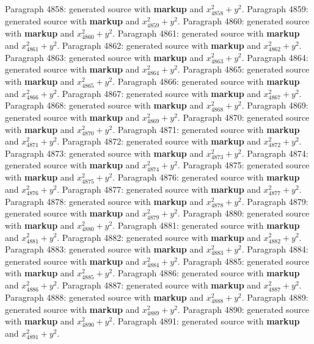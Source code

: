 \documentclass{article}
\begin{document}
Paragraph 4858: generated source with \textbf{markup} and $x_{4858}^2 + y^2$.
Paragraph 4859: generated source with \textbf{markup} and $x_{4859}^2 + y^2$.
Paragraph 4860: generated source with \textbf{markup} and $x_{4860}^2 + y^2$.
Paragraph 4861: generated source with \textbf{markup} and $x_{4861}^2 + y^2$.
Paragraph 4862: generated source with \textbf{markup} and $x_{4862}^2 + y^2$.
Paragraph 4863: generated source with \textbf{markup} and $x_{4863}^2 + y^2$.
Paragraph 4864: generated source with \textbf{markup} and $x_{4864}^2 + y^2$.
Paragraph 4865: generated source with \textbf{markup} and $x_{4865}^2 + y^2$.
Paragraph 4866: generated source with \textbf{markup} and $x_{4866}^2 + y^2$.
Paragraph 4867: generated source with \textbf{markup} and $x_{4867}^2 + y^2$.
Paragraph 4868: generated source with \textbf{markup} and $x_{4868}^2 + y^2$.
Paragraph 4869: generated source with \textbf{markup} and $x_{4869}^2 + y^2$.
Paragraph 4870: generated source with \textbf{markup} and $x_{4870}^2 + y^2$.
Paragraph 4871: generated source with \textbf{markup} and $x_{4871}^2 + y^2$.
Paragraph 4872: generated source with \textbf{markup} and $x_{4872}^2 + y^2$.
Paragraph 4873: generated source with \textbf{markup} and $x_{4873}^2 + y^2$.
Paragraph 4874: generated source with \textbf{markup} and $x_{4874}^2 + y^2$.
Paragraph 4875: generated source with \textbf{markup} and $x_{4875}^2 + y^2$.
Paragraph 4876: generated source with \textbf{markup} and $x_{4876}^2 + y^2$.
Paragraph 4877: generated source with \textbf{markup} and $x_{4877}^2 + y^2$.
Paragraph 4878: generated source with \textbf{markup} and $x_{4878}^2 + y^2$.
Paragraph 4879: generated source with \textbf{markup} and $x_{4879}^2 + y^2$.
Paragraph 4880: generated source with \textbf{markup} and $x_{4880}^2 + y^2$.
Paragraph 4881: generated source with \textbf{markup} and $x_{4881}^2 + y^2$.
Paragraph 4882: generated source with \textbf{markup} and $x_{4882}^2 + y^2$.
Paragraph 4883: generated source with \textbf{markup} and $x_{4883}^2 + y^2$.
Paragraph 4884: generated source with \textbf{markup} and $x_{4884}^2 + y^2$.
Paragraph 4885: generated source with \textbf{markup} and $x_{4885}^2 + y^2$.
Paragraph 4886: generated source with \textbf{markup} and $x_{4886}^2 + y^2$.
Paragraph 4887: generated source with \textbf{markup} and $x_{4887}^2 + y^2$.
Paragraph 4888: generated source with \textbf{markup} and $x_{4888}^2 + y^2$.
Paragraph 4889: generated source with \textbf{markup} and $x_{4889}^2 + y^2$.
Paragraph 4890: generated source with \textbf{markup} and $x_{4890}^2 + y^2$.
Paragraph 4891: generated source with \textbf{markup} and $x_{4891}^2 + y^2$.
\end{document}
